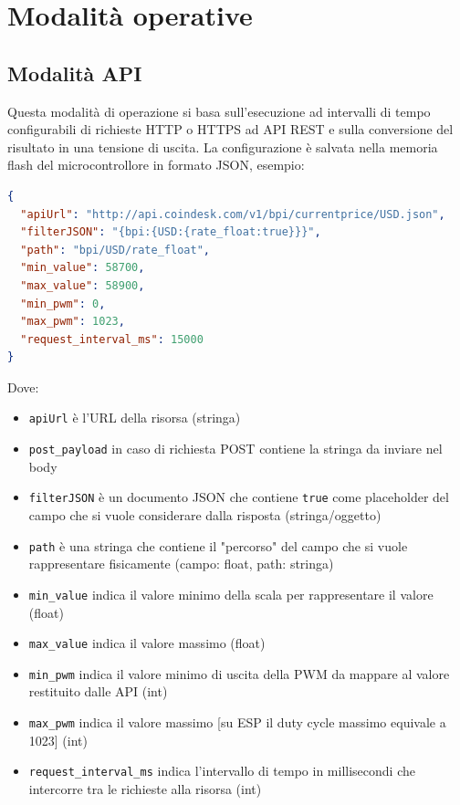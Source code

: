 \documentclass[12pt,a4paper]{report}
\begin{document}
\pagebreak
\section{Modalità operative}

\subsection{Modalità API}
Questa modalità di operazione si basa sull'esecuzione ad intervalli di tempo configurabili di richieste HTTP o HTTPS ad API REST
e sulla conversione del risultato in una tensione di uscita.
La configurazione è salvata nella memoria flash del microcontrollore
in formato JSON, esempio:

\begin{lstlisting}[language=json,firstnumber=1]
{
  "apiUrl": "http://api.coindesk.com/v1/bpi/currentprice/USD.json",
  "filterJSON": "{bpi:{USD:{rate_float:true}}}",
  "path": "bpi/USD/rate_float",
  "min_value": 58700,
  "max_value": 58900,
  "min_pwm": 0,
  "max_pwm": 1023,
  "request_interval_ms": 15000
}
\end{lstlisting}


\noindent Dove:
\begin{itemize}
  \item \texttt{apiUrl} è l'URL della risorsa (stringa)
  \item \texttt{post_payload} in caso di richiesta POST contiene la stringa da inviare nel body
  \item \texttt{filterJSON} è un documento JSON che contiene \texttt{true} come placeholder del campo che si vuole considerare dalla risposta (stringa/oggetto)
  \item \texttt{path} è una stringa che contiene il "percorso" del campo che si vuole rappresentare fisicamente (campo: float, path: stringa)
  \item \texttt{min_value} indica il valore minimo della scala per rappresentare il valore (float)
  \item \texttt{max_value} indica il valore massimo (float)
  \item \texttt{min_pwm} indica il valore minimo di uscita della PWM da mappare al valore restituito dalle API (int)
  \item \texttt{max_pwm} indica il valore massimo [su ESP il duty cycle massimo equivale a 1023] (int)
  \item \texttt{request_interval_ms} indica l'intervallo di tempo in millisecondi che intercorre tra le richieste alla risorsa (int)
\end{itemize}
\end{document}
